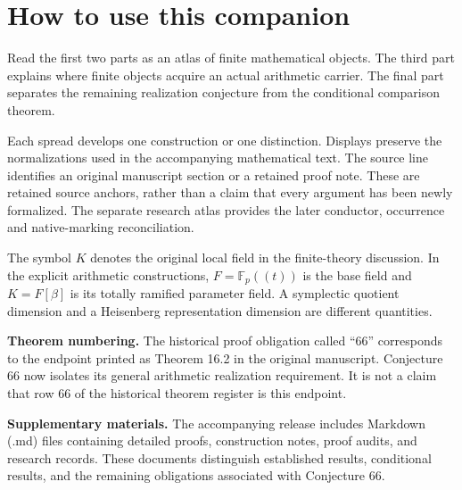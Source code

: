 \documentclass[11pt,letterpaper]{article}
\newcommand\F{\mathbb F}\newcommand\C{\mathbb C}\newcommand\OO{\mathcal O}
\begin{document}
\KomorebiCover
{}

\section*{How to use this companion}
{}
Read the first two parts as an atlas of finite mathematical objects. The third part explains where finite objects acquire an actual arithmetic carrier. The final part separates the remaining realization conjecture from the conditional comparison theorem.

Each spread develops one construction or one distinction. Displays preserve the normalizations used in the accompanying mathematical text. The source line identifies an original manuscript section or a retained proof note. These are retained source anchors, rather than a claim that every argument has been newly formalized. The separate research atlas provides the later conductor, occurrence and native-marking reconciliation.

The symbol $K$ denotes the original local field in the finite-theory discussion. In the explicit arithmetic constructions, $F=\F_p((t))$ is the base field and $K=F[\beta]$ is its totally ramified parameter field. A symplectic quotient dimension and a Heisenberg representation dimension are different quantities.

\textbf{Theorem numbering.} The historical proof obligation called ``66'' corresponds to the endpoint printed as Theorem 16.2 in the original manuscript. Conjecture 66 now isolates its general arithmetic realization requirement. It is not a claim that row 66 of the historical theorem register is this endpoint.

\textbf{Supplementary materials.} The accompanying release includes Markdown (.md) files containing detailed proofs, construction notes, proof audits, and research records. These documents distinguish established results, conditional results, and the remaining obligations associated with Conjecture 66.
\end{document}

